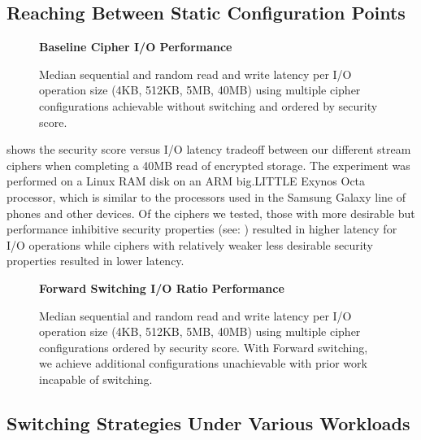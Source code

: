 \subsection{Reaching Between Static Configuration Points}

\begin{figure*}[ht] \textbf{Baseline Cipher I/O Performance}\par\medskip
  \centering
  {} \caption{Median sequential and random
  read and write latency per I/O operation size (4KB, 512KB, 5MB, 40MB) using
  multiple cipher configurations achievable without switching and ordered by
  security score.}
 \label{fig:tradeoff-no-ratios}
\end{figure*}

 shows the security score versus I/O latency tradeoff
between our different stream ciphers when completing a 40MB read of encrypted
storage. The experiment was performed on a Linux RAM disk on an ARM big.LITTLE
Exynos Octa processor, which is similar to the processors used in the Samsung
Galaxy line of phones and other devices. Of the ciphers we tested, those with
more desirable but performance inhibitive security properties (see:
) resulted in higher latency for I/O operations while ciphers
with relatively weaker less desirable security properties resulted in lower
latency.

\begin{figure*}[ht]
  \textbf{Forward Switching I/O Ratio Performance}\par\medskip
  \centering
  {} \caption{Median sequential and
  random read and write latency per I/O operation size (4KB, 512KB, 5MB, 40MB)
  using multiple cipher configurations ordered by security score. With Forward
  switching, we achieve additional configurations unachievable with prior work
  incapable of switching.}
 \label{fig:tradeoff-with-ratios}
\end{figure*}


\subsection{Switching Strategies Under Various Workloads}

